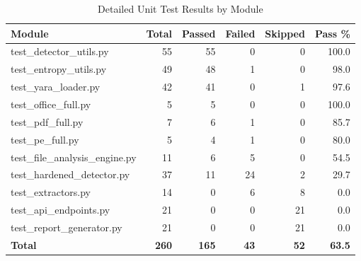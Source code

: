 

\begin{table}[h]
\centering
\caption{Detailed Unit Test Results by Module}
\label{tab:detailed_test_results}
\begin{tabular}{|l|r|r|r|r|r|}
\hline
\textbf{Module} & \textbf{Total} & \textbf{Passed} & \textbf{Failed} & \textbf{Skipped} & \textbf{Pass \%} \\
\hline
test\_detector\_utils.py & 55 & 55 & 0 & 0 & 100.0 \\
test\_entropy\_utils.py & 49 & 48 & 1 & 0 & 98.0 \\
test\_yara\_loader.py & 42 & 41 & 0 & 1 & 97.6 \\
test\_office\_full.py & 5 & 5 & 0 & 0 & 100.0 \\
test\_pdf\_full.py & 7 & 6 & 1 & 0 & 85.7 \\
test\_pe\_full.py & 5 & 4 & 1 & 0 & 80.0 \\
test\_file\_analysis\_engine.py & 11 & 6 & 5 & 0 & 54.5 \\
test\_hardened\_detector.py & 37 & 11 & 24 & 2 & 29.7 \\
test\_extractors.py & 14 & 0 & 6 & 8 & 0.0 \\
test\_api\_endpoints.py & 21 & 0 & 0 & 21 & 0.0 \\
test\_report\_generator.py & 21 & 0 & 0 & 21 & 0.0 \\
\hline
\textbf{Total} & \textbf{260} & \textbf{165} & \textbf{43} & \textbf{52} & \textbf{63.5} \\
\hline
\end{tabular}
\end{table}


